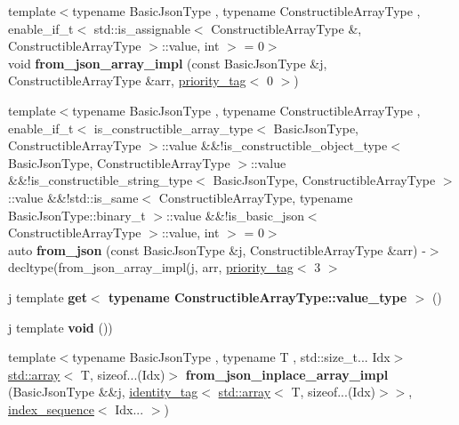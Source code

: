 \begin{DoxyCompactItemize}
\mbox{\label{namespacenlohmann_1_1detail_a3b306ea5f5176f748572ca5b1c9a4dda}} 
{\footnotesize template$<$typename Basic\+Json\+Type , typename Constructible\+Array\+Type , enable\+\_\+if\+\_\+t$<$ std\+::is\+\_\+assignable$<$ Constructible\+Array\+Type \&, Constructible\+Array\+Type $>$\+::value, int $>$  = 0$>$ }\\void {\bfseries from\+\_\+json\+\_\+array\+\_\+impl} (const Basic\+Json\+Type \&j, Constructible\+Array\+Type \&arr, \hyperlink{structnlohmann_1_1detail_1_1priority__tag}{priority\+\_\+tag}$<$ 0 $>$)
\item 
\mbox{\label{namespacenlohmann_1_1detail_a14d8cdf544585f1c38eab6a0820e55f7}} 
{\footnotesize template$<$typename Basic\+Json\+Type , typename Constructible\+Array\+Type , enable\+\_\+if\+\_\+t$<$ is\+\_\+constructible\+\_\+array\+\_\+type$<$ Basic\+Json\+Type, Constructible\+Array\+Type $>$\+::value \&\&!is\+\_\+constructible\+\_\+object\+\_\+type$<$ Basic\+Json\+Type, Constructible\+Array\+Type $>$\+::value \&\&!is\+\_\+constructible\+\_\+string\+\_\+type$<$ Basic\+Json\+Type, Constructible\+Array\+Type $>$\+::value \&\&!std\+::is\+\_\+same$<$ Constructible\+Array\+Type, typename Basic\+Json\+Type\+::binary\+\_\+t $>$\+::value \&\&!is\+\_\+basic\+\_\+json$<$ Constructible\+Array\+Type $>$\+::value, int $>$  = 0$>$ }\\auto {\bfseries from\+\_\+json} (const Basic\+Json\+Type \&j, Constructible\+Array\+Type \&arr) -\/$>$ decltype(from\+\_\+json\+\_\+array\+\_\+impl(j, arr, \hyperlink{structnlohmann_1_1detail_1_1priority__tag}{priority\+\_\+tag}$<$ 3 $>$
\item 
\mbox{\label{namespacenlohmann_1_1detail_ad9e016d7b6a3cd2847027950aa0aac3b}} 
j template {\bfseries get$<$ typename Constructible\+Array\+Type\+::value\+\_\+type $>$} ()
\item 
\mbox{\label{namespacenlohmann_1_1detail_a59fca69799f6b9e366710cb9043aa77d}} 
j template {\bfseries void} ())
\item 
\mbox{\label{namespacenlohmann_1_1detail_a8f4713d1d9c1a0a5e1503c2fbafd4e40}} 
{\footnotesize template$<$typename Basic\+Json\+Type , typename T , std\+::size\+\_\+t... Idx$>$ }\\\hyperlink{namespacenlohmann_1_1detail_a1ed8fc6239da25abcaf681d30ace4985af1f713c9e000f5d3f280adbd124df4f5}{std\+::array}$<$ T, sizeof...(Idx)$>$ {\bfseries from\+\_\+json\+\_\+inplace\+\_\+array\+\_\+impl} (Basic\+Json\+Type \&\&j, \hyperlink{structnlohmann_1_1detail_1_1identity__tag}{identity\+\_\+tag}$<$ \hyperlink{namespacenlohmann_1_1detail_a1ed8fc6239da25abcaf681d30ace4985af1f713c9e000f5d3f280adbd124df4f5}{std\+::array}$<$ T, sizeof...(Idx)$>$$>$, \hyperlink{structnlohmann_1_1detail_1_1integer__sequence}{index\+\_\+sequence}$<$ Idx... $>$)
$$
\end{DoxyCompactItemize}
